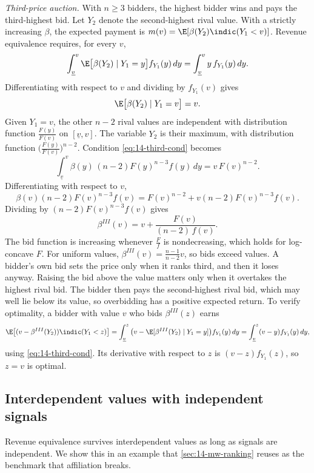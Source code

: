 \emph{Third-price auction.} With $n\ge 3$ bidders, the highest bidder wins and pays the third-highest bid. Let $Y_2$ denote the second-highest rival value. With a strictly increasing $\beta$, the expected payment is $m(v)=\E[\beta(Y_2)\indic(Y_1<v)]$. Revenue equivalence requires, for every $v$,
\[
\int_{\underline v}^v\E\big[\beta(Y_2)\mid Y_1=y\big]f_{Y_1}(y)\,dy=\int_{\underline v}^v y\,f_{Y_1}(y)\,dy.
\]
Differentiating with respect to $v$ and dividing by $f_{Y_1}(v)$ gives
\begin{equation}\label{eq:14-third-cond}
\E\big[\beta(Y_2)\mid Y_1=v\big]=v.
\end{equation}
Given $Y_1=v$, the other $n-2$ rival values are independent with distribution function $\frac{F(y)}{F(v)}$ on $[\underline v,v]$. The variable $Y_2$ is their maximum, with distribution function $\big(\frac{F(y)}{F(v)}\big)^{n-2}$. Condition \eqref{eq:14-third-cond} becomes
\[
\int_{\underline v}^v\beta(y)\,(n-2)F(y)^{n-3}f(y)\,dy=v\,F(v)^{n-2}.
\]
Differentiating with respect to $v$,
\[
\beta(v)(n-2)F(v)^{n-3}f(v)=F(v)^{n-2}+v(n-2)F(v)^{n-3}f(v).
\]
Dividing by $(n-2)F(v)^{n-3}f(v)$ gives
\begin{equation}\label{eq:14-third-bid}
\beta^{III}(v)=v+\frac{F(v)}{(n-2)\,f(v)}.
\end{equation}
The bid function is increasing whenever $\frac{F}{f}$ is nondecreasing, which holds for log-concave $F$. For uniform values, $\beta^{III}(v)=\frac{n-1}{n-2}v$, so bids exceed values. A bidder's own bid sets the price only when it ranks third, and then it loses anyway. Raising the bid above the value matters only when it overtakes the highest rival bid. The bidder then pays the second-highest rival bid, which may well lie below its value, so overbidding has a positive expected return. To verify optimality, a bidder with value $v$ who bids $\beta^{III}(z)$ earns
\[
\E\big[(v-\beta^{III}(Y_2))\indic(Y_1<z)\big]=\int_{\underline v}^z\big(v-\E[\beta^{III}(Y_2)\mid Y_1=y]\big)f_{Y_1}(y)\,dy=\int_{\underline v}^z(v-y)f_{Y_1}(y)\,dy,
\]
using \eqref{eq:14-third-cond}. Its derivative with respect to $z$ is $(v-z)f_{Y_1}(z)$, so $z=v$ is optimal.

\subsection{Interdependent values with independent signals}\label{sec:14-ret-interdependent}

Revenue equivalence survives interdependent values as long as signals are independent. We show this in an example that \cref{sec:14-mw-ranking} reuses as the benchmark that affiliation breaks.

